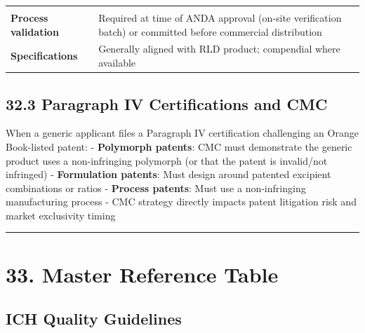 \documentclass[
  11pt,
  a4paper,
]{report}
\begin{document}
\begin{longtable}[]{@{}ll@{}}
\begin{minipage}[t]{0.38\columnwidth}
\end{minipage}\tabularnewline
\begin{minipage}[t]{0.56\columnwidth}\raggedright
\textbf{Process validation}\strut
\end{minipage} & \begin{minipage}[t]{0.38\columnwidth}\raggedright
Required at time of ANDA approval (on-site verification batch) or
committed before commercial distribution\strut
\end{minipage}\tabularnewline
\begin{minipage}[t]{0.56\columnwidth}\raggedright
\textbf{Specifications}\strut
\end{minipage} & \begin{minipage}[t]{0.38\columnwidth}\raggedright
Generally aligned with RLD product; compendial where available\strut
\end{minipage}\tabularnewline
\bottomrule
\end{longtable}

\hypertarget{paragraph-iv-certifications-and-cmc}{%
\subsection{32.3 Paragraph IV Certifications and
CMC}\label{paragraph-iv-certifications-and-cmc}}

When a generic applicant files a Paragraph IV certification challenging
an Orange Book-listed patent: - \textbf{Polymorph patents}: CMC must
demonstrate the generic product uses a non-infringing polymorph (or that
the patent is invalid/not infringed) - \textbf{Formulation patents}:
Must design around patented excipient combinations or ratios -
\textbf{Process patents}: Must use a non-infringing manufacturing
process - CMC strategy directly impacts patent litigation risk and
market exclusivity timing

\begin{center}\rule{0.5\linewidth}{0.5pt}\end{center}

\hypertarget{master-reference-table}{%
\section{33. Master Reference Table}\label{master-reference-table}}

\hypertarget{ich-quality-guidelines}{%
\subsection{ICH Quality Guidelines}\label{ich-quality-guidelines}}
\end{document}
